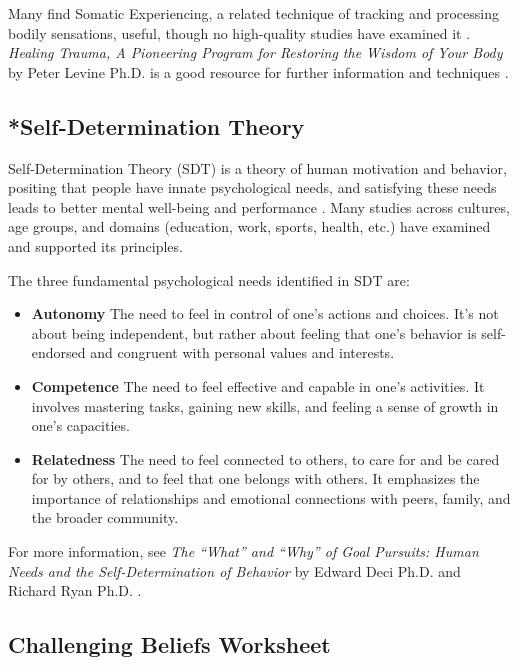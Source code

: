 \documentclass[12pt,letterpaper]{article}
\begin{document}
Many find Somatic Experiencing, a related technique of tracking and processing bodily sensations, useful, though no high-quality studies have examined it \cite{kuhfußSomatic}. \textit{Healing Trauma, A Pioneering Program for Restoring the Wisdom of Your Body} by Peter Levine Ph.D. is a good resource for further information and techniques \cite{levineSomatic}.
\subsection{*Self-Determination Theory}
\label{sec:sdt}
Self-Determination Theory (SDT) is a theory of human motivation and behavior, positing that people have innate psychological needs, and satisfying these needs leads to better mental well-being and performance \cite{deciSDT}. Many studies across cultures, age groups, and domains (education, work, sports, health, etc.) have examined and supported its principles.

The three fundamental psychological needs identified in SDT are:
\begin{itemize}
    \item \textbf{Autonomy} The need to feel in control of one's actions and choices. It's not about being independent, but rather about feeling that one's behavior is self-endorsed and congruent with personal values and interests.
    \item \textbf{Competence} The need to feel effective and capable in one's activities. It involves mastering tasks, gaining new skills, and feeling a sense of growth in one's capacities.
    \item \textbf{Relatedness} The need to feel connected to others, to care for and be cared for by others, and to feel that one belongs with others. It emphasizes the importance of relationships and emotional connections with peers, family, and the broader community.
\end{itemize}
For more information, see \textit{The “What” and “Why” of Goal Pursuits: Human Needs and the Self-Determination of Behavior} by Edward Deci Ph.D. and Richard Ryan Ph.D. \cite{deciSDT}.
\subsection{Challenging Beliefs Worksheet}
\label{challenge}

\printbibliography
\label{sec:bibliography}
\end{document}
